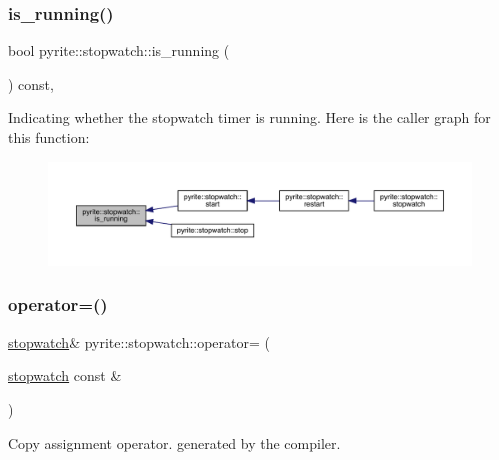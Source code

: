 \subsubsection{\texorpdfstring{is\+\_\+running()}{is\_running()}}
{\footnotesize\ttfamily bool pyrite\+::stopwatch\+::is\+\_\+running (\begin{DoxyParamCaption}{ }\end{DoxyParamCaption}) const\hspace{0.3cm}{\ttfamily [inline]}, {\ttfamily [noexcept]}}

Indicating whether the stopwatch timer is running. Here is the caller graph for this function\+:
\nopagebreak
\begin{figure}[H]
\begin{center}
\leavevmode
\includegraphics[width=350pt]{d6/dd1/classpyrite_1_1stopwatch_add72890f54bc7554c32b9588ac761eed_icgraph}
\end{center}
\end{figure}
\mbox{\label{classpyrite_1_1stopwatch_a74042d6442db0cc278a76c6c548ed47b}} 
\subsubsection{\texorpdfstring{operator=()}{operator=()}\hspace{0.1cm}{\footnotesize\ttfamily [1/2]}}
{\footnotesize\ttfamily \mbox{\hyperlink{classpyrite_1_1stopwatch}{stopwatch}}\& pyrite\+::stopwatch\+::operator= (\begin{DoxyParamCaption}\item[{\mbox{\hyperlink{classpyrite_1_1stopwatch}{stopwatch}} const \&}]{ }\end{DoxyParamCaption})\hspace{0.3cm}{\ttfamily [default]}}

Copy assignment operator. generated by the compiler. \mbox{\label{classpyrite_1_1stopwatch_a54c39e020d176c0e79d9726d44d41be2}} 
